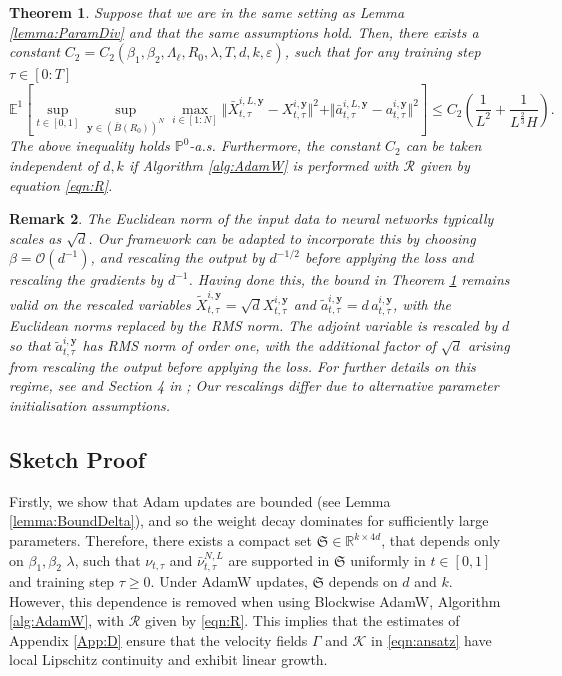 \documentclass{article}
\newtheorem{theorem}{Theorem}
\newtheorem{remark}[theorem]{Remark}
\newcommand{\R}{\mathbb{R}}
\begin{document}
\begin{theorem}\label{theorem:WTS}
    Suppose that we are in the same setting as Lemma \ref{lemma:ParamDiv} and that the same assumptions hold. Then, there exists a constant $C_2=C_2(\beta_1,\beta_2,\Lambda_\ell,R_0,\lambda,T, d,k,\varepsilon)$, such that for any training step $\tau  \in [0:T]$
    \[
    \mathbb E^1\left[\sup_{t \in [0,1]}\sup_{\bm{y}\in(\bar B(R_0))^N}\max_{i\in[1:N]}\Vert \bar X^{i,L,\bm{y}}_{t,\tau} - X^{i,\bm{y}}_{t,\tau}\Vert^2+ \Vert \bar a^{i,L,\bm{y}}_{t,\tau} - a^{i,\bm{y}}_{t,\tau}\Vert^2 \right] \le C_2 \left(\frac{1}{L^{2}}+\frac{1}{ L^{\frac{2}{3}}H}\right).
    \] 
    The above inequality holds $\mathbb P^0$-a.s. Furthermore, the constant $C_2$ can be taken independent of $d,k$ if Algorithm \ref{alg:AdamW} is performed with $\mathcal R$ given by equation \eqref{eqn:R}.
\end{theorem}
\begin{remark}
The Euclidean norm of the input data to neural networks typically scales as $\sqrt{d}$. Our framework can be adapted to incorporate this by choosing $\beta=\mathcal O(d^{-1})$, and rescaling the output by $d^{-1/2}$ before applying the loss and rescaling the gradients by $d^{-1}$. Having done this, the bound in Theorem \ref{theorem:WTS} remains valid on the rescaled variables $\widetilde{X}^{i,\bm{y}}_{t,\tau}=\sqrt{d}X^{i,\bm{y}}_{t,\tau}$ and $\widetilde{a}^{i,\bm{y}}_{t,\tau}=d\,a^{i,\bm{y}}_{t,\tau}$, with the Euclidean norms replaced by the RMS norm. The adjoint variable is rescaled by $d$ so that $\widetilde{a}^{i,\bm{y}}_{t,\tau}$ has RMS norm of order one, with the additional factor of $\sqrt{d}$ arising from rescaling the output before applying the loss. For further details on this regime, see \cite{chaintron2026resnets} and Section 4 in \cite{chizat2025hiddenwidthdeepresnets}; Our rescalings differ due to alternative parameter initialisation assumptions. 
\end{remark}
\subsection{Sketch Proof}
 Firstly, we show that Adam updates are bounded (see Lemma \ref{lemma:BoundDelta}), and so the weight decay dominates for sufficiently large parameters. Therefore, there exists a compact set $\mathfrak{S}\in \R^{k\times 4d}$, that depends only on  $\beta_1,\beta_2$ $\lambda$, such that $\nu_{t,\tau}$ and $\bar \nu^{N,L}_{t,\tau}$ are supported in $\mathfrak{S}$ uniformly in $t\in[0,1]$ and training step $\tau\ge 0$. Under AdamW updates, $\mathfrak{S}$ depends on $d$ and $k$. However, this dependence is removed  when using Blockwise AdamW, Algorithm \ref{alg:AdamW}, with $\mathcal R$ given by \eqref{eqn:R}. This implies that the estimates of Appendix \ref{App:D} ensure that the velocity fields $\Gamma$ and $\mathcal K$ in \eqref{eqn:ansatz} have local Lipschitz continuity and exhibit linear growth.
\end{document}
